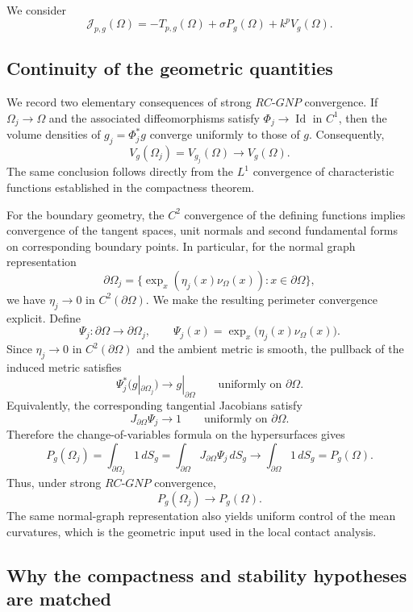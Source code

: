 \documentclass{article}
\renewcommand{\boxed}[1]{#1}
\begin{document}
We consider
\[
\boxed{
\mathcal J_{p,g}(\Omega)
=
-T_{p,g}(\Omega)
+\sigma P_g(\Omega)
+k^pV_g(\Omega).
}
\]


\subsection{Continuity of the geometric quantities}

We record two elementary consequences of strong $RC$-$GNP$ convergence.
If $\Omega_j\to\Omega$ and the associated diffeomorphisms satisfy
$\Phi_j\to\operatorname{Id}$ in $C^1$, then the volume densities of
$g_j=\Phi_j^*g$ converge uniformly to those of $g$. Consequently,
\[
V_g(\Omega_j)
=V_{g_j}(\Omega)
\longrightarrow V_g(\Omega).
\]
The same conclusion follows directly from the $L^1$ convergence of
characteristic functions established in the compactness theorem.

For the boundary geometry, the $C^2$ convergence of the defining
functions implies convergence of the tangent spaces, unit normals and
second fundamental forms on corresponding boundary points. In
particular, for the normal graph representation
\[
\partial\Omega_j
=
\{\exp_x(\eta_j(x)\nu_\Omega(x)):x\in\partial\Omega\},
\]
we have $\eta_j\to0$ in $C^2(\partial\Omega)$. We make the resulting
perimeter convergence explicit. Define
\[
\Psi_j:\partial\Omega\longrightarrow\partial\Omega_j,
\qquad
\Psi_j(x)=\exp_x\bigl(\eta_j(x)\nu_\Omega(x)\bigr).
\]
Since $\eta_j\to0$ in $C^2(\partial\Omega)$ and the ambient metric is
smooth, the pullback of the induced metric satisfies
\[
\Psi_j^*\bigl(g|_{\partial\Omega_j}\bigr)
\longrightarrow g|_{\partial\Omega}
\qquad\text{uniformly on }\partial\Omega.
\]
Equivalently, the corresponding tangential Jacobians satisfy
\[
J_{\partial\Omega}\Psi_j\longrightarrow1
\qquad\text{uniformly on }\partial\Omega.
\]
Therefore the change-of-variables formula on the hypersurfaces gives
\[
P_g(\Omega_j)
=
\int_{\partial\Omega_j}1\,dS_g
=
\int_{\partial\Omega}J_{\partial\Omega}\Psi_j\,dS_g
\longrightarrow
\int_{\partial\Omega}1\,dS_g
=P_g(\Omega).
\]
Thus, under strong $RC$-$GNP$ convergence,
\[
P_g(\Omega_j)\longrightarrow P_g(\Omega).
\]
The same normal-graph representation also yields uniform control of the
mean curvatures, which is the geometric input used in the local contact
analysis.

\subsection{Why the compactness and stability hypotheses are matched}
\end{document}
